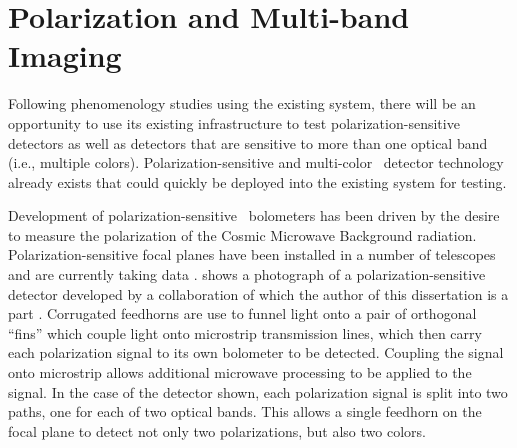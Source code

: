 \section{Polarization and Multi-band Imaging}

Following phenomenology studies using the existing system, there will be an opportunity to use its existing infrastructure to test polarization-sensitive detectors as well as detectors that are sensitive to more than one optical band (i.e., multiple colors).
Polarization-sensitive and multi-color \TES\ detector technology already exists that could quickly be deployed into the existing system for testing.

Development of polarization-sensitive \TES\ bolometers has been driven by the desire to measure the polarization of the Cosmic Microwave Background radiation.
Polarization-sensitive focal planes have been installed in a number of telescopes and are currently taking data \cite{obrient_antenna-coupled_2012,austermann_sptpol:_2012,keating_ultra_2011,niemack_actpol:_2010,kusaka_modulation_2013}.
 shows a photograph of a polarization-sensitive detector developed by a collaboration of which the author of this dissertation is a part \cite{datta_horn_2014}.
Corrugated feedhorns are use to funnel light onto a pair of orthogonal ``fins'' which couple light onto microstrip transmission lines, which then carry each polarization signal to its own bolometer to be detected.
Coupling the signal onto microstrip allows additional microwave processing to be applied to the signal.
In the case of the detector shown, each polarization signal is split into two paths, one for each of two optical bands.
This allows a single feedhorn on the focal plane to detect not only two polarizations, but also two colors.

